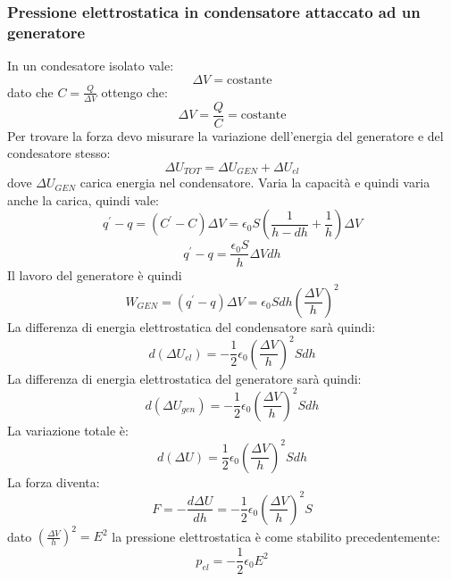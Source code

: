 \documentclass[class=book, crop=false, oneside, 12pt]{standalone}
\begin{document}
\subsubsection*{Pressione elettrostatica in condensatore attaccato ad un generatore}

In un condesatore isolato vale:
\begin{equation*}
    \Delta V = \text{costante}
\end{equation*}
dato che \(C = \frac{Q}{\Delta V}\) ottengo che:
\begin{equation*}
    \Delta V = \frac{Q}{C} = \text{costante}
\end{equation*} 
Per trovare la forza devo misurare la variazione dell'energia del generatore e del condesatore stesso:
\begin{equation*}
    \Delta U_{TOT} = \Delta U_{GEN} + \Delta U_{el}
\end{equation*}
dove \(\Delta U_{GEN}\) carica energia nel condensatore.\newline 
Varia la capacità e quindi varia anche la carica, quindi vale:
\begin{equation*}
    q^{\prime} - q  = \left(C^{\prime }- C\right) \Delta V = \epsilon_0 S \left(\frac{1}{h-dh} + \frac{1}{h}\right) \Delta V
\end{equation*}
\begin{equation*}
    q^{\prime} - q  = \frac {\epsilon_0 S}{h} \Delta V dh 
\end{equation*}
Il lavoro del generatore è quindi
\begin{equation*}
    W_{GEN} = \left(q^{\prime} - q\right) \Delta V = \epsilon_0 S dh \left(\frac{\Delta V }{h}\right)^2 
\end{equation*}
La differenza di energia elettrostatica del condensatore sarà quindi:
\begin{equation*}
    d \left(\Delta U_{el}\right) = - \frac{1}{2} \epsilon_0 \left(\frac{\Delta V}{h}\right)^2 S dh 
\end{equation*}
La differenza di energia elettrostatica del generatore sarà quindi:
\begin{equation*}
    d \left(\Delta U_{gen}\right) = - \frac{1}{2} \epsilon_0 \left(\frac{\Delta V}{h}\right)^2 S dh 
\end{equation*}
La variazione totale è:
\begin{equation*}
    d \left(\Delta U\right) = \frac{1}{2} \epsilon_0 \left(\frac{\Delta V}{h}\right)^2 S dh 
\end{equation*}
La forza diventa:
\begin{equation*}
    F = - \frac{d \Delta U }{dh} =  - \frac{1}{2} \epsilon_0 \left(\frac{\Delta V}{h}\right)^2 S
\end{equation*}
dato \(\left(\frac{\Delta V}{h}\right)^2 = E^2\) la pressione elettrostatica è come stabilito precedentemente:
\begin{equation*}
    p_{el} = - \frac{1}{2} \epsilon_0 E^2
\end{equation*}
\end{document}
